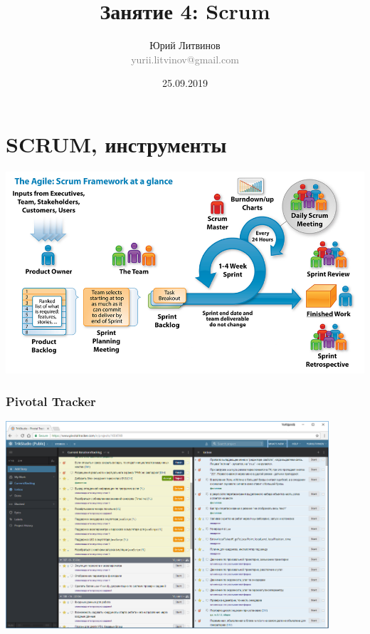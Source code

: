 \documentclass[xetex,mathserif,serif]{beamer}
\title{Занятие 4: Scrum}
\author[Юрий Литвинов]{Юрий Литвинов\\\small{\textcolor{gray}{yurii.litvinov@gmail.com}}}
\date{25.09.2019}
\begin{document}
	\frame{\titlepage}

	\section{SCRUM, инструменты}

	\begin{frame}
		\begin{center}
			\includegraphics[width=\textwidth]{scrum.png}
		\end{center}
	\end{frame}

	\begin{frame}
		\frametitle{Pivotal Tracker}
		\begin{center}
			\includegraphics[width=0.9\textwidth]{pivotalTracker.png}
		\end{center}
	\end{frame}
\end{document}
